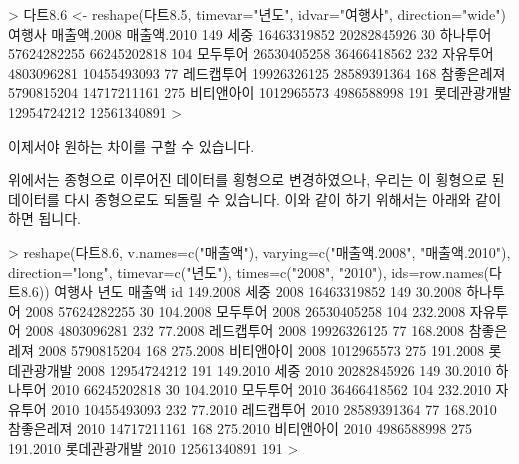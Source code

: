 \documentclass[tutorial.tex]{subfiles}
\begin{document}
\begin{Schunk}
\begin{Soutput}
> 다트8.6 <- reshape(다트8.5, timevar="년도", idvar="여행사", direction="wide")
          여행사 매출액.2008 매출액.2010
149         세중 16463319852 20282845926
30      하나투어 57624282255 66245202818
104     모두투어 26530405258 36466418562
232     자유투어  4803096281 10455493093
77    레드캡투어 19926326125 28589391364
168   참좋은레져  5790815204 14717211161
275   비티앤아이  1012965573  4986588998
191 롯데관광개발 12954724212 12561340891
> 
\end{Soutput}
\end{Schunk}

이제서야 원하는 차이를 구할 수 있습니다.

\begin{Schunk}
\end{Schunk}

위에서는 종형으로 이루어진 데이터를 횡형으로 변경하였으나, 우리는 이 횡형으로 된 데이터를 다시 종형으로도 되돌릴 수 있습니다. 
이와 같이 하기 위해서는 아래와 같이 하면 됩니다.

\begin{Schunk}
\begin{Soutput}
> reshape(다트8.6,  v.names=c("매출액"), varying=c("매출액.2008", "매출액.2010"), direction="long", timevar=c("년도"), times=c("2008", "2010"), ids=row.names(다트8.6))
               여행사 년도      매출액  id
149.2008         세중 2008 16463319852 149
30.2008      하나투어 2008 57624282255  30
104.2008     모두투어 2008 26530405258 104
232.2008     자유투어 2008  4803096281 232
77.2008    레드캡투어 2008 19926326125  77
168.2008   참좋은레져 2008  5790815204 168
275.2008   비티앤아이 2008  1012965573 275
191.2008 롯데관광개발 2008 12954724212 191
149.2010         세중 2010 20282845926 149
30.2010      하나투어 2010 66245202818  30
104.2010     모두투어 2010 36466418562 104
232.2010     자유투어 2010 10455493093 232
77.2010    레드캡투어 2010 28589391364  77
168.2010   참좋은레져 2010 14717211161 168
275.2010   비티앤아이 2010  4986588998 275
191.2010 롯데관광개발 2010 12561340891 191
> 
\end{Soutput}
\end{Schunk}
\end{document}
